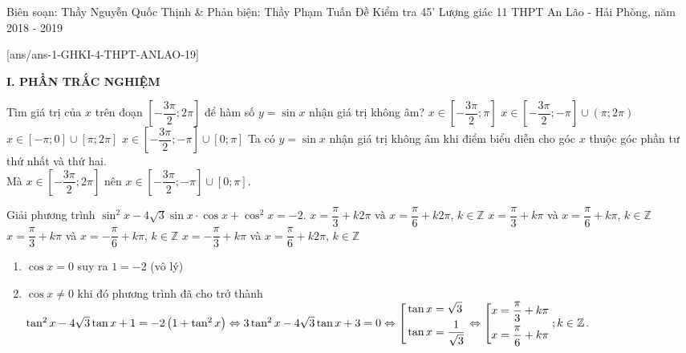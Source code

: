 \begin{name}
{Biên soạn: Thầy Nguyễn Quốc Thịnh \& Phản biện: Thầy Phạm Tuấn}
{Đề Kiểm tra 45' Lượng giác 11 THPT An Lão - Hải Phòng, năm 2018 - 2019}
\end{name}

\setcounter{ex}{0}\setcounter{bt}{0}
[ans/ans-1-GHKI-4-THPT-ANLAO-19]

\noindent\textbf{I. PHẦN TRẮC NGHIỆM}

\begin{ex}%
	Tìm giá trị của $x$ trên đoạn $\left[-\dfrac{3\pi}{2};2\pi \right]$ để hàm số $y=\sin x$ nhận giá trị không âm?
	\choice
	{$x \in \left[-\dfrac{3\pi}{2};\pi \right]$}
	{$x \in \left[-\dfrac{3\pi}{2};-\pi \right] \cup \left(\pi;2\pi \right)$}
	{ $x \in  \left[-\pi;0 \right] \cup  \left[\pi;2\pi \right]$}
	{\True $x \in \left[-\dfrac{3\pi}{2};-\pi \right] \cup \left[0;\pi \right]$}
	\loigiai
	{ 
		Ta có $y=\sin x$ nhận giá trị không âm khi điểm biểu diễn cho góc $x$ thuộc góc phần tư thứ nhất và thứ hai.\\
		Mà $x \in \left[-\dfrac{3\pi}{2};2\pi \right]$ nên $x \in \left[-\dfrac{3\pi}{2};-\pi \right] \cup \left[0;\pi \right]$.
	}
\end{ex}
\begin{ex}%
	Giải phương trình $\sin^2 x-4\sqrt{3}\sin x \cdot \cos x +\cos^2 x=-2$.
	\choice
	{$x=\dfrac{\pi}{3}+k2\pi$ và $x=\dfrac{\pi}{6}+k2\pi$, $k \in \mathbb{Z}$}
	{\True $x=\dfrac{\pi}{3}+k\pi$ và $x=\dfrac{\pi}{6}+k\pi$, $k \in \mathbb{Z}$}
	{$x=\dfrac{\pi}{3}+k\pi$ và $x=-\dfrac{\pi}{6}+k\pi$, $k \in \mathbb{Z}$}
	{$x=-\dfrac{\pi}{3}+k\pi$ và $x=\dfrac{\pi}{6}+k2\pi$, $k \in \mathbb{Z}$}
	\loigiai
	{ 
		\begin{enumerate}[1)]
			\item $\cos x =0$ suy ra $1=-2$ (vô lý)
			\item $\cos x \neq 0$ khi đó phương trình đã cho trở thành $\tan^2 x-4\sqrt{3}\tan x +1=-2\left(1+\tan^2 x \right) \Leftrightarrow 3\tan^2 x-4\sqrt{3}\tan x +3=0 \Leftrightarrow
			\left[\begin{aligned}&\tan x=\sqrt{3}\\&\tan x =\dfrac{1}{\sqrt{3}}\\\end{aligned}\right.
			\Leftrightarrow \left[\begin{aligned}&x=\dfrac{\pi}{3}+k\pi\\&x=\dfrac{\pi}{6}+k\pi\\\end{aligned}\right.; k \in \mathbb{Z}
			$.
		\end{enumerate}
	}
\end{ex}
